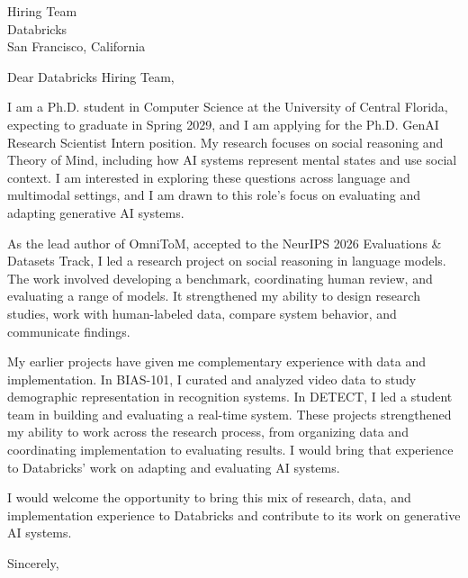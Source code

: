 \documentclass[11pt]{letter}
\begin{document}
\begin{letter}{Hiring Team\\Databricks\\San Francisco, California}
\date{October 16, 2026}
\opening{Dear Databricks Hiring Team,}

I am a Ph.D. student in Computer Science at the University of Central Florida, expecting to graduate in Spring 2029, and I am applying for the Ph.D. GenAI Research Scientist Intern position. My research focuses on social reasoning and Theory of Mind, including how AI systems represent mental states and use social context. I am interested in exploring these questions across language and multimodal settings, and I am drawn to this role's focus on evaluating and adapting generative AI systems.

As the lead author of OmniToM, accepted to the NeurIPS 2026 Evaluations \& Datasets Track, I led a research project on social reasoning in language models. The work involved developing a benchmark, coordinating human review, and evaluating a range of models. It strengthened my ability to design research studies, work with human-labeled data, compare system behavior, and communicate findings.

My earlier projects have given me complementary experience with data and implementation. In BIAS-101, I curated and analyzed video data to study demographic representation in recognition systems. In DETECT, I led a student team in building and evaluating a real-time system. These projects strengthened my ability to work across the research process, from organizing data and coordinating implementation to evaluating results. I would bring that experience to Databricks' work on adapting and evaluating AI systems.

I would welcome the opportunity to bring this mix of research, data, and implementation experience to Databricks and contribute to its work on generative AI systems.

\closing{Sincerely,}
\end{letter}
\end{document}
